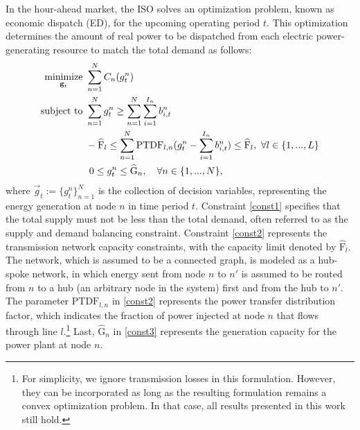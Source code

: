 \documentclass{article}
\theoremstyle{definition}
\theoremstyle{plain}
\newcommand{\minimize}[1]{\displaystyle\minim_{#1}}
\newcommand{\minim}{\mathop{\hbox{\rm minimize}}}
\newcommand{\sbjt}{\mathrm{subject\ to}}
\providecommand{\vg}{\ensuremath{\vec{g}}}
\begin{document}
In the hour-ahead market, the ISO solves an optimization problem, known as economic dispatch (ED), for the upcoming operating period $t$. This optimization determines the amount of real power to be dispatched from each electric power-generating resource to match the total demand as follows:
\begin{align}
\minimize{\vg_t} &\ \sum_{n=1}^{N} C_n(g^n_{t}) \label{obj1}\\
\sbjt &\ \sum_{n=1}^{N} g^n_{t} \geq \sum_{n=1}^{N}\sum_{i=1}^{I_n} b^{n}_{i,t}  \label{const1}\\ 
& \ -\widehat{\mathrm{F}}_l \leq \sum_{n=1}^{N} \mathrm{PTDF}_{l, n} (g^n_{t}- \sum_{i=1}^{I_n} b^{n}_{i,t})\leq \widehat{\mathrm{F}}_l, \ \forall l \in \{1,...,L\} \label{const2}\\
&\ \ 0 \leq g^n_{t} \leq \widehat{\mathrm{G}}_n, \quad \forall n \in \{1,...,N\}, \label{const3}
\end{align}
where $\vg_t:= \{g^n_{t}\}_{n=1}^N$ is the collection of decision variables, representing the energy generation at node $n$ in time period $t$. 
Constraint \eqref{const1} specifies that the total supply must not be less than the total demand, often referred to as the supply and demand balancing constraint. 
Constraint \eqref{const2} represents the transmission network capacity constraints, with the capacity limit denoted by $\widehat{\mathrm{F}}_l$.  The network, which is assumed to be a connected graph, is modeled as a hub-spoke network, in which energy sent from node $n$ to $n'$ is assumed to be routed from $n$ to a hub (an arbitrary node in the system) first and from the hub to $n'$. The parameter $\mathrm{PTDF}_{l,n}$ in \eqref{const2} represents the power transfer distribution factor, which indicates the fraction of power injected at node $n$ that flows through line $l$.\footnote{For simplicity, we ignore transmission losses in this formulation. However, they can be incorporated as long as the resulting formulation remains a convex optimization problem. In that case, all results presented in this work still hold.
}  Last, $\widehat{\mathrm{G}}_n$ in \eqref{const3} represents the generation capacity for the power plant at node $n$. 
\end{document}
